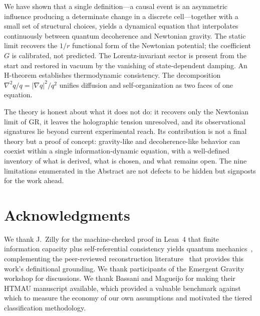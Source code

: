 \documentclass[aps,prd,twocolumn,showpacs,superscriptaddress,preprintnumbers]{revtex4-2}
\begin{document}
We have shown that a single definition---a causal event is an asymmetric influence producing a determinate change in a discrete cell---together with a small set of structural choices, yields a dynamical equation that interpolates continuously between quantum decoherence and Newtonian gravity. The static limit recovers the $1/r$ functional form of the Newtonian potential; the coefficient $G$ is calibrated, not predicted. The Lorentz-invariant sector is present from the start and restored in vacuum by the vanishing of state-dependent damping. An H-theorem establishes thermodynamic consistency. The decomposition $\nabla^2 q/q = |\nabla q|^2/q^2$ unifies diffusion and self-organization as two faces of one equation.

The theory is honest about what it does not do: it recovers only the Newtonian limit of GR, it leaves the holographic tension unresolved, and its observational signatures lie beyond current experimental reach. Its contribution is not a final theory but a proof of concept: gravity-like and decoherence-like behavior can coexist within a single information-dynamic equation, with a well-defined inventory of what is derived, what is chosen, and what remains open. The nine limitations enumerated in the Abstract are not defects to be hidden but signposts for the work ahead.

\section*{Acknowledgments}

We thank J.~Zilly for the machine-checked proof in Lean~4 that finite information capacity plus self-referential consistency yields quantum mechanics~\cite{Zilly:2026}, complementing the peer-reviewed reconstruction literature~\cite{Zeilinger1999,Dakic2011,Chiribella2011,Masanes2011,Shaghaghi2023} that provides this work's definitional grounding.
We thank participants of the Emergent Gravity workshop for discussions.
We thank Bassani and Magueijo for making their HTMAU manuscript available, which provided a valuable benchmark against which to measure the economy of our own assumptions and motivated the tiered classification methodology.
\end{document}
